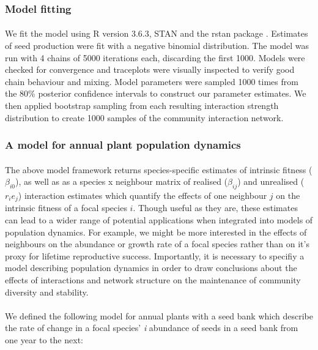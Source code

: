 \documentclass[a4,12pt]{article}
\begin{document}
        \subsubsection{Model fitting}

        \paragraph{}
        We fit the model using R version 3.6.3, STAN and the rstan package \parencite{R2020, Carpenter2017, Rstan2020}. Estimates of seed production were fit with a negative binomial distribution. The model was run with 4 chains of 5000 iterations each, discarding the first 1000. Models were checked for convergence and traceplots were visually inspected to verify good chain behaviour and mixing. Model parameters were sampled 1000 times from the 80\% posterior confidence intervals to construct our parameter estimates. We then applied bootstrap sampling from each resulting interaction strength distribution to create 1000 samples of the community interaction network.

        \subsubsection{A model for annual plant population dynamics}
        \label{SI:popdyn}

        \paragraph{}
        The above model framework returns species-specific estimates of intrinsic fitness ($\beta_{i0}$), as well as as a species x neighbour matrix of realised ($\beta_{ij}$) and unrealised ($r_i e_j$) interaction estimates which quantify the effects of one neighbour $j$ on the intrinsic fitness of a focal species $i$. Though useful as they are, these estimates can lead to a wider range of potential applications when integrated into models of population dynamics. For example, we might be more interested in the effects of neighbours on the abundance or growth rate of a focal species rather than on it's proxy for lifetime reproductive success. Importantly, it is necessary to specifiy a model describing population dynamics in order to draw conclusions about the effects of interactions and network structure on the maintenance of community diversity and stability. 

        \paragraph{} 
        We defined the following model for annual plants with a seed bank \parencite{Levine2009, Mayfield2017, Bimler2018} which describe the rate of change in a focal species' \textit{i} abundance of seeds in a seed bank from one year to the next: 
    
\end{document}
